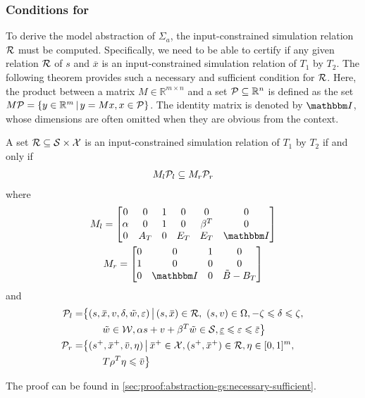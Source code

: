 \subsubsection{Conditions for \RSet} %
\label{sec:abstraction-gs:feedforward:conditions}

To derive the model abstraction of $\Sigma_{a}$, the input-constrained simulation relation $\mathcal{R}$ must be computed.
Specifically, we need to be able to certify if any given relation $\mathcal{R}$ of $s$ and $\overbar{x}$ is an input-constrained simulation relation of $T_{1}$ by $T_{2}$.
The following theorem provides such a necessary and sufficient condition for $\mathcal{R}$.
Here, the product between a matrix $M \in \mathbb{R}^{m \times n}$ and a set $\mathcal{P} \subseteq \mathbb{R}^{n}$ is defined as the set $M \mathcal{P} = \{ y \in \mathbb{R}^{m} \,|\, y = M x, x \in \mathcal{P}\}$.
The identity matrix is denoted by $\IdentityMatrix$, whose dimensions are often omitted when they are obvious from the context.

\begin{theorem}
  \label{thm:abstraction-gs:necessary-sufficient}
  A set $\mathcal{R} \subseteq \mathcal{S} \times \mathcal{X}$ is an input-constrained simulation relation of $T_{1}$ by $T_{2}$ if and only if
  \begin{align*}
    M_l \mathcal{P}_l \subseteq M_r \mathcal{P}_r
  \end{align*}
  where 
  \begin{gather*}
    M_l =
          \begin{bmatrix}
            0 & 0 & 1 & 0 & 0 & 0 \\
            \alpha & 0 & 1 & 0 & \beta^{T} & 0 \\
            0 & A_T & 0 & E_T & E_T & \IdentityMatrix
          \end{bmatrix}\\
    M_r =
      \begin{bmatrix}
        0 & 0 & 1 & 0 \\
        1 & 0 & 0 & 0 \\
        0 & \IdentityMatrix & 0 & \tilde{B} - B_{T}
      \end{bmatrix}
  \end{gather*}
  and
  \begin{align*}
    \PSet_l =& \big\{ (s,\overbar{x}, v, \delta, \tilde{w}, \varepsilon) \,\big|\,
              (s,\overbar{x}) \in \RSet,\ (s,v) \in \Omega, -\zeta \leqslant \delta \leqslant \zeta,\big.\\
            &\qquad \big. \tilde{w} \in \WSet,  \alpha s + v + \beta^{T} \tilde{w} \in \SSet, \underline{\varepsilon} \leqslant \varepsilon \leqslant \overbar{\varepsilon} \big\} \\
    \PSet_r =& \big\{(s^+, \overbar{x}^{+}, \overbar{v}, \eta) \,\big|\,
               \overbar{x}^{+} \in \XSet, (s^{+}, \overbar{x}^{+}) \in \RSet, \eta \in [0,1]^{m},\big.\\
             &\qquad \big. T \rho^{T} \eta \leqslant \overbar{v}\big\}
  \end{align*}
\end{theorem}
The proof can be found in \cref{sec:proof:abstraction-gs:necessary-sufficient}.

